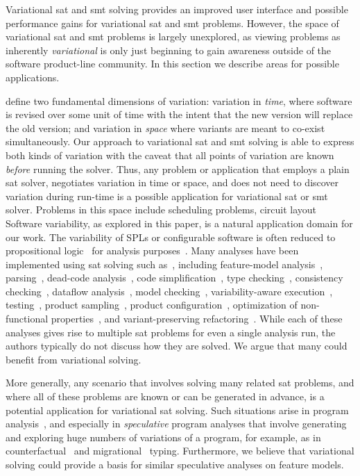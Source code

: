 \label{section:conclusion:applications}
%
Variational \ac{sat} and \ac{smt} solving provides an improved user interface
and possible performance gains for variational \ac{sat} and \ac{smt} problems.
However, the space of variational \ac{sat} and \ac{smt} problems is largely
unexplored, as viewing problems as inherently \emph{variational} is only just
beginning to gain awareness outside of the software product-line community. In
this section we describe areas for possible applications.

\citet{TTS+:VariVolution19} define two fundamental dimensions of variation:
variation in \emph{time}, where software is revised over some unit of time with
the intent that the new version will replace the old version; and variation in
\emph{space} where variants are meant to co-exist simultaneously. Our approach
to variational \ac{sat} and \ac{smt} solving is able to express both kinds of
variation with the caveat that all points of variation are known \emph{before}
running the solver. Thus, any problem or application that employs a plain
\ac{sat} solver, negotiates variation in time or space, and does not need to
discover variation during run-time is a possible application for variational
\ac{sat} or \ac{smt} solver. Problems in this space include scheduling problems,
circuit layout
%
Software variability, as explored in this paper, is a natural application domain
for our work. The variability of SPLs or configurable software is often reduced
to propositional logic~\citep{B05,CW07,MWCC08} for analysis
purposes~\citep{BSRC10,TAK+:CSUR14,GBT+19}. Many analyses have been implemented
using \ac{sat} solving such as~\cite{TAK+:CSUR14}, including feature-model
analysis~\citep{BSRC10,GBT+19}, parsing~\citep{KGR+:OOPSLA11}, dead-code
analysis~\citep{TLSS:EuroSys11}, code simplification~\citep{RGA+:ICSE15}, type
checking~\citep{TBKC07}, consistency checking~\citep{CP06}, dataflow
analysis~\citep{LKA+:ESECFSE13}, model checking~\citep{CCS+13},
variability-aware execution~\citep{NKN:ICSE14}, testing~\citep{MMCA:IST14},
product sampling~\citep{MKR+:ICSE16,VAT+:SPLC18}, product
configuration~\citep{SIMA:ASE13}, optimization of non-functional
properties~\citep{SRK+:SQJ12}, and variant-preserving
refactoring~\citep{FMS+:SANER17}. While each of these analyses gives rise to
multiple \ac{sat} problems for even a single analysis run, the authors typically
do not discuss how they are solved. We argue that many could benefit from
variational solving.

More generally, any scenario that involves solving many related \ac{sat}
problems, and where all of these problems are known or can be generated in
advance, is a potential application for variational \ac{sat} solving.
%
Such situations arise in program analysis~\citep{VGD:FSE12}, and especially in
\emph{speculative} program analyses that involve generating and exploring huge
numbers of variations of a program, for example, as in
counterfactual~\citep{CE14popl} and migrational~\citep{CCW18icfp,CCEW18popl}
typing. Furthermore, we believe that variational solving could provide a basis
for similar speculative analyses on feature models.


